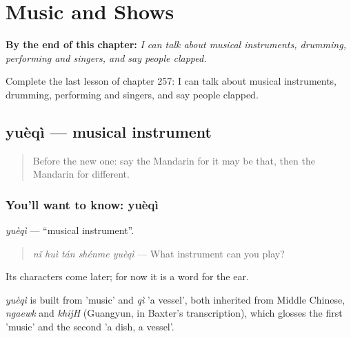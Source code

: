 
\chapter{Music and Shows}
\label{ch:zh-music-and-shows}

\begin{chapteropening}
\textbf{By the end of this chapter:} \emph{I can talk about musical instruments, drumming, performing and singers, and say people clapped.}

Complete the last lesson of chapter 257: I can talk about musical instruments, drumming, performing and singers, and say people clapped.
\end{chapteropening}

\section[yuèqì]{yuèqì — musical instrument}

\label{lesson:ZH-C257-yueqi}



\begin{quote}
Before the new one: say the Mandarin for it may be that, then the Mandarin for different.
\end{quote}

\subsection*{You'll want to know: yuèqì}
\emph{yuèqì} — \textquotedblleft{}musical instrument\textquotedblright{}.

\begin{quote}
\emph{nǐ huì tán shénme yuèqì} — What instrument can you play?
\end{quote}

Its characters come later; for now it is a word for the ear.

\begin{cousinweb}
\emph{yuèqì} is built from  'music' and \emph{qì} 'a vessel', both inherited from Middle Chinese, \emph{ngaewk} and \emph{khijH} (Guangyun, in Baxter's transcription), which glosses the first 'music' and the second 'a dish, a vessel'.
\end{cousinweb}

